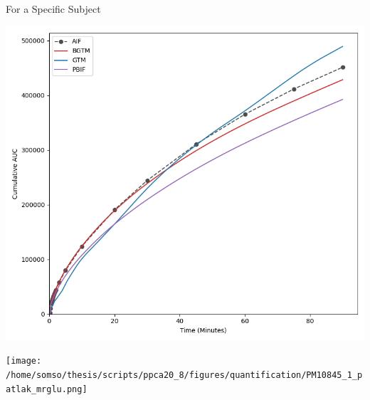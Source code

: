 \documentclass[aspectratio=169]{beamer}
\begin{document}
\begin{frame}[t]{For a Specific Subject}
	\begin{center}
		\vfill
		\begin{minipage}{0.48\textwidth}
			\centering
			\includegraphics[width=\linewidth]{PM10845_1_cauc.png}
		\end{minipage}
		\begin{minipage}{0.48\textwidth}
			\centering
			\texttt{[image: /home/somso/thesis/scripts/ppca20\_8/figures/quantification/PM10845\_1\_patlak\_mrglu.png]}
		\end{minipage}
		\vfill
	\end{center}
\end{frame}
\end{document}
